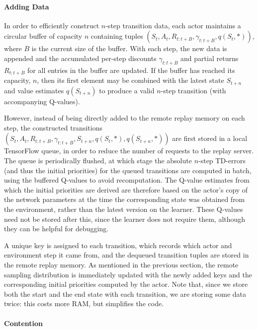 \documentclass{article} \PassOptionsToPackage{usenames,dvipsnames}{xcolor}
\begin{document}
\paragraph{Adding Data}

In order to efficiently construct $n$-step transition data, each actor maintains a circular buffer of capacity $n$ containing tuples $(S_t, A_t, R_{t:t+B}, \gamma_{t:t+B}, q(S_t, *))$, where $B$ is the current size of the buffer. With each step, the new data is appended and the accumulated per-step discounts $\gamma_{t:t+B}$ and partial returns $R_{t:t+B}$ for all entries in the buffer are updated. If the buffer has reached its capacity, $n$, then its first element may be combined with the latest state $S_{t+n}$ and value estimates $q(S_{t+n})$ to produce a valid $n$-step transition (with accompanying Q-values).

However, instead of being directly added to the remote replay memory on each step, the constructed transitions $(S_t, A_t, R_{t:t+B}, \gamma_{t:t+B}, S_{t+n}, q(S_t, *), q(S_{t+n}, *))$ are first stored in a local TensorFlow queue, in order to reduce the number of requests to the replay server. The queue is periodically flushed, at which stage the absolute $n$-step TD-errors (and thus the initial priorities) for the queued transitions are computed in batch, using the buffered Q-values to avoid recomputation. The Q-value estimates from which the initial priorities are derived are therefore based on the actor's copy of the network parameters at the time the corresponding state was obtained from the environment, rather than the latest version on the learner. These Q-values need not be stored after this, since the learner does not require them, although they can be helpful for debugging.

A unique key is assigned to each transition, which records which actor and environment step it came from, and the dequeued transition tuples are stored in the remote replay memory. As mentioned in the previous section, the remote sampling distribution is immediately updated with the newly added keys and the corresponding initial priorities computed by the actor. Note that, since we store both the start and the end state with each transition, we are storing some data twice: this costs more RAM, but simplifies the code.

\paragraph{Contention}
\end{document}

